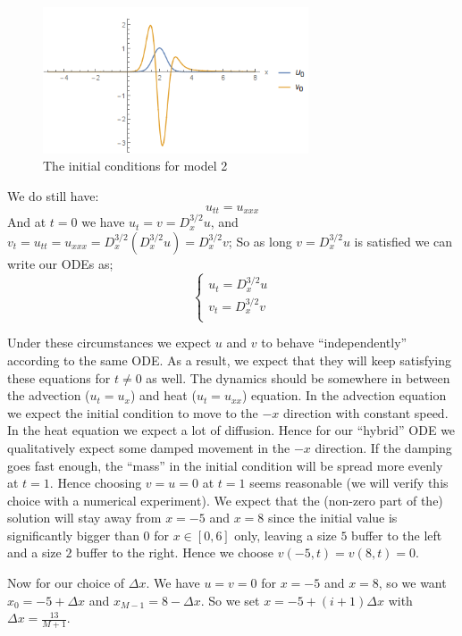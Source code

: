 \documentclass{article}
\renewcommand{\(}{\left(}
\renewcommand{\)}{\right)}
\newcommand{\dx}{\Delta x}
\begin{document}
\begin{figure}
\centering
\includegraphics[width=0.7\textwidth]{2init.png}
\caption{The initial conditions for model 2}
\label{fig:2init}
\end{figure}
We do still have:
$$u_{tt} = u_{xxx}$$
And at $t=0$ we have $u_t = v = D^{3/2}_x u$, and $v_t = u_{tt} = u_{xxx} = D^{3/2}_x(D^{3/2}_x u) = D^{3/2}_x v$;
So as long $v = D^{3/2}_x u$ is satisfied we can write our ODEs as;
$$
\begin{cases}
u_t = D^{3/2}_x u\\
v_t = D^{3/2}_x v\\
\end{cases}
$$

Under these circumstances we expect $u$ and $v$ to behave ``independently'' according to the same ODE. As a result, we expect that they will keep satisfying these equations for $t\not = 0$ as well. The dynamics should be somewhere in between the advection ($u_t = u_{x}$) and heat ($u_t = u_{xx}$) equation. In the advection equation we expect the initial condition to move to the $-x$ direction with constant speed. In the heat equation we expect a lot of diffusion. Hence for our ``hybrid'' ODE we qualitatively expect some damped movement in the $-x$ direction. If the damping goes fast enough, the ``mass'' in the initial condition will be spread more evenly at $t = 1$. Hence choosing $v = u = 0$ at $t = 1$ seems reasonable (we will verify this choice with a numerical experiment). We expect that the (non-zero part of the) solution will stay away from $x=-5$ and $x=8$ since the initial value is significantly bigger than $0$ for $x\in [0, 6]$ only, leaving a size $5$ buffer to the left and a size $2$ buffer to the right. Hence we choose $v(-5, t) = v(8, t) = 0$. 

Now for our choice of $\dx$. We have $u = v = 0$ for $x = -5$ and $x = 8$, so we want $x_0 = -5 + \dx$ and $x_{M-1} = 8 - \dx$. So we set $x = -5 + (i+1)\dx$ with $\dx = \frac{13}{M+1}$.
\end{document}
